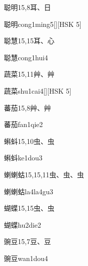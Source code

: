 \begin{entry}{聪明}{15,8}{⽿、⽇}
  \begin{phonetics}{聪明}{cong1ming5}[][HSK 5]
  \end{phonetics}
\end{entry}

\begin{entry}{聪慧}{15,15}{⽿、⼼}
  \begin{phonetics}{聪慧}{cong1hui4}
  \end{phonetics}
\end{entry}

\begin{entry}{蔬菜}{15,11}{⾋、⾋}
  \begin{phonetics}{蔬菜}{shu1cai4}[][HSK 5]
  \end{phonetics}
\end{entry}

\begin{entry}{蕃茄}{15,8}{⾋、⾋}
  \begin{phonetics}{蕃茄}{fan1qie2}
  \end{phonetics}
\end{entry}

\begin{entry}{蝌蚪}{15,10}{⾍、⾍}
  \begin{phonetics}{蝌蚪}{ke1dou3}
  \end{phonetics}
\end{entry}

\begin{entry}{蝲蝲蛄}{15,15,11}{⾍、⾍、⾍}
  \begin{phonetics}{蝲蝲蛄}{la4la4gu3}
  \end{phonetics}
\end{entry}

\begin{entry}{蝴蝶}{15,15}{⾍、⾍}
  \begin{phonetics}{蝴蝶}{hu2die2}
  \end{phonetics}
\end{entry}

\begin{entry}{豌豆}{15,7}{⾖、⾖}
  \begin{phonetics}{豌豆}{wan1dou4}
  \end{phonetics}
\end{entry}

